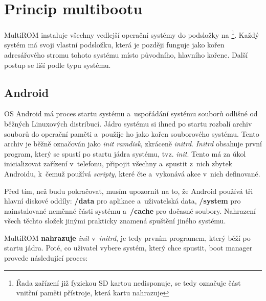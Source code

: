 \documentclass[12pt, a4paper, oneside]{article}
\newcommand{\B}{\textbf} %
\newcommand{\It}{\textit}  %
\begin{document}
\newpage
\section {Princip multibootu}
\label{princip-multibootu}
MultiROM instaluje všechny vedlejší operační systémy do podsložky na \footnote{Řada zařízení již fyzickou SD kartou nedisponuje,  se tedy označuje část vnitřní paměti přístroje, která kartu nahrazuje}. Každý systém má svoji vlastní podsložku, která je později funguje jako kořen adresářového stromu tohoto systému místo původního, hlavního kořene. Další postup se liší podle typu systému.

\subsection{Android}
OS Android má proces startu systému a~uspořádání systému souborů odlišné od běžných Linuxových distribucí. Jádro systému si ihned po startu rozbalí archiv souborů do operační paměti a~použije ho jako kořen souborového systému. Tento archiv je běžně označován jako \It{init ramdisk}, zkráceně \It{initrd}. \It{Initrd} obsahuje první program, který se spustí po startu jádra systému, tvz. \It{init}. Tento má za úkol inicializovat zařízení v~telefonu, připojit všechny  a~spustit z~nich zbytek Androidu, k~čemuž používá \It{scripty}, které čte a~vykonává akce v~nich definované.

Před tím, než budu pokračovat, musím upozornit na to, že Android používá tři hlavní diskové oddíly: \B{/data} pro aplikace a~uživatelská data, \B{/system} pro nainstalované neměnné části systému a~\B{/cache} pro dočasné soubory. Nahrazení všech těchto složek jinými prakticky znamená spuštění jiného systému.

MultiROM \B{nahrazuje} \It{init} v~\It{initrd}, je tedy prvním programem, který běží po startu jádra. Poté, co uživatel vybere systém, který chce spustit, boot manager provede následující proces:
\end{document}
